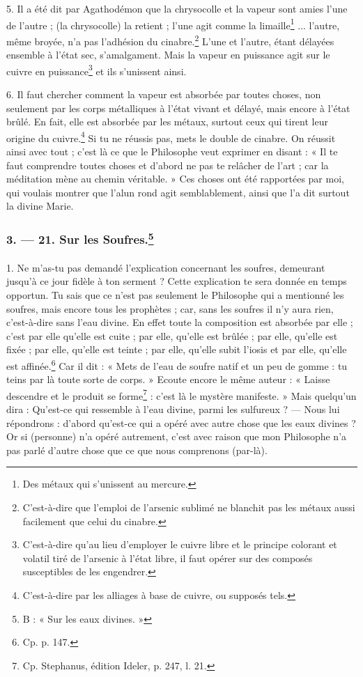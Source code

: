 \documentclass[landscape, a4paper, 11pt, oneside, polutonikogreek, french]{article}
\begin{document}
5. Il a été dit par Agathodémon que la chrysocolle et la vapeur sont amies l'une de l'autre ; (la chrysocolle) la retient ; l'une agit comme la limaille\footnote{Des métaux qui s'unissent au mercure.} ... l'autre, même broyée, n'a pas l'adhésion du cinabre.\footnote{C'est-à-dire que l'emploi de l'arsenic sublimé ne blanchit pas les métaux aussi facilement que celui du cinabre.} L'une et l'autre, étant délayées ensemble à l'état sec, s'amalgament. Mais la vapeur en puissance agit sur le cuivre en puissance\footnote{C'est-à-dire qu'au lieu d'employer le cuivre libre et le principe colorant et volatil tiré de l'arsenic à l'état libre, il faut opérer sur des composés susceptibles de les engendrer.} et ils s'unissent ainsi.

6. Il faut chercher comment la vapeur est absorbée par toutes choses, non seulement par les corps métalliques à l'état vivant et délayé, mais encore à l'état brûlé. En fait, elle est absorbée par les métaux, surtout ceux qui tirent leur origine du cuivre.\footnote{C'est-à-dire par les alliages à base de cuivre, ou supposés tels.} Si tu ne réussis pas, mets le double de cinabre. On réussit ainsi avec tout ; c'est là ce que le Philosophe veut exprimer en disant : « Il te faut comprendre toutes choses et d'abord ne pas te relâcher de l'art ; car la méditation mène au chemin véritable. » Ces choses ont été rapportées par moi, qui voulais montrer que l'alun rond agit semblablement, ainsi que l'a dit surtout la divine Marie.

\bigskip
\centerline{\EightStarTaper}
\centerline{\EightStarTaper\EightStarTaper}
\bigskip

\subsubsection[3. --- 21. Sur les Soufres.]{3. --- 21. Sur les Soufres.\footnote{B : « Sur les eaux divines. »}}
\paragraph{}
1. Ne m'as-tu pas demandé l'explication concernant les soufres, demeurant jusqu'à ce jour fidèle à ton serment ? Cette explication te sera donnée en temps opportun. Tu sais que ce n'est pas seulement le Philosophe qui a mentionné les soufres, mais encore tous les prophètes ; car, sans les soufres il n'y aura rien, c'est-à-dire sans l'eau divine. En effet toute la composition est absorbée par elle ; c'est par elle qu'elle est cuite ; par elle, qu'elle est brûlée ; par elle, qu'elle est fixée ; par elle, qu'elle est teinte ; par elle, qu'elle subit l'iosis et par elle, qu'elle est affinée.\footnote{Cp. p. 147.} Car il dit : « Mets de l'eau de soufre natif et un peu de gomme : tu teins par là toute sorte de corps. » Ecoute encore le même auteur : « Laisse descendre et le produit se forme\footnote{Cp. Stephanus, édition Ideler, p. 247, l. 21.} : c'est là le mystère manifeste. » Mais quelqu'un dira : Qu'est-ce qui ressemble à l'eau divine, parmi les sulfureux ? --- Nous lui répondrons : d'abord qu'est-ce qui a opéré avec autre chose que les eaux divines ? Or si (personne) n'a opéré autrement, c'est avec raison que mon Philosophe n'a pas parlé d'autre chose que ce que nous comprenons (par-là).
\end{document}
